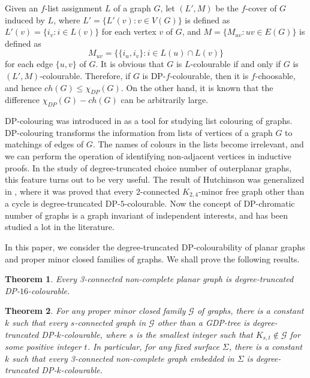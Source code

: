 \documentclass[11pt,a4paper]{article}
\newtheorem{theorem}{Theorem}
\theoremstyle{definition}
\begin{document}
Given an $f$-list assignment $L$ of a graph $G$, let $(L',M)$ be the  $f$-cover of $G$ induced by $L$, where    
$L'=\{L'(v): v \in V(G)\}$ is defined as $L'(v) = \{i_v: i \in L(v)\}$
 for each vertex $v$ of $G$, and $M=\{M_{uv}: uv \in E(G)\}$ is defined as $$M_{uv}=\{\{i_u,i_v\}: i \in L(u) \cap L(v)\}$$
for each edge $\{u,v\}$ of $G$.
It is obvious that $G$ is $L$-colourable if and only if $G$ is $(L',M)$-colourable. Therefore, if $G$ is DP-$f$-colourable, then it is $f$-choosable, and hence $ch(G) \le \chi_{DP}(G)$.
On the other hand, it is known \cite{Bernshteyn2016} that the difference $\chi_{DP}(G)-ch(G)$ can be arbitrarily large. 

DP-colouring was introduced in \cite{DP} as a tool for studying list colouring of graphs. DP-colouring transforms the information from lists of vertices of a graph $G$ to matchings of edges of $G$. The names of colours in the lists become irrelevant, and we can perform the operation of identifying non-adjacent vertices in inductive proofs. In the study of degree-truncated choice number of outerplanar graphs, this feature turns out to be very useful. The result of Hutchinson was generalized in \cite{LWZZ}, where it was proved that every 2-connected $K_{2,4}$-minor free graph other than a cycle is degree-truncated DP-$5$-colourable.
Now the concept of DP-chromatic number of graphs is a graph invariant of independent interests, and has been studied a lot in the literature. 
 
      


In this paper, we consider the degree-truncated DP-colourability of planar graphs and proper minor closed families of graphs. We shall prove the following results.  


\begin{theorem}
    \label{thm-planarDP}
    Every 3-connected non-complete planar graph is degree-truncated DP-$16$-colourable.
\end{theorem} 


\begin{theorem}
    \label{thm-minorDP}
    For any proper minor closed family $\mathcal{G}$ of graphs, there is a constant $k$  such that every $s$-connected   graph in $\mathcal{G}$ other than a GDP-tree is degree-truncated DP-$k$-colourable, where $s$ is the smallest integer such that $K_{s,t} \notin \mathcal{G}$ for some positive integer $t$. In particular, for any fixed surface $\Sigma$, there is a constant $k$ such that every 3-connected non-complete graph embedded in $\Sigma$ is degree-truncated DP-$k$-colourable. 
\end{theorem}
\end{document}
